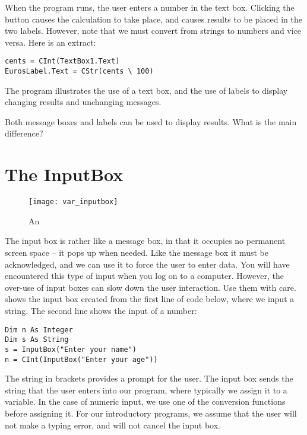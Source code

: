 		When the program runs, the user enters a number in the text box. Clicking the button causes the calculation to take place, and causes results to be placed in the two labels. However, note that we must convert from strings to numbers and vice versa. Here is an extract:
		\begin{lstlisting}
cents = CInt(TextBox1.Text)
EurosLabel.Text = CStr(cents \ 100)
		\end{lstlisting}
		The program illustrates the use of a text box, and the use of labels to display changing results and unchanging messages.

		\begin{stqb}
			\begin{STQ}
				\item	Both message boxes and labels can be used to display results. What is the main difference?
			\end{STQ}
		\end{stqb}


	\section{The InputBox}	
		\begin{figure}[ht]
			\centering
			\texttt{[image: var\_inputbox]}
			\caption{An }
			\label{fig:var_inputbox}
		\end{figure}
		The input box is rather like a message box, in that it occupies no permanent screen space – it pops up when needed. Like the message box it must be acknowledged, and we can use it to force the user to enter data. You will have encountered this type of input when you log on to a computer. However, the over-use of input boxes can slow down the user interaction. Use them with care.  shows the input box created from the first line of code below, where we input a string. The second line shows the input of a number:
		\begin{lstlisting}
Dim n As Integer
Dim s As String
s = InputBox("Enter your name")
n = CInt(InputBox("Enter your age"))
		\end{lstlisting}
		The string in brackets provides a prompt for the user. The input box sends the string that the user enters into our program, where typically we assign it to a variable. In the case of numeric input, we use one of the conversion functions before assigning it. For our introductory programs, we assume that the user will not make a typing error, and will not cancel the input box.
	

